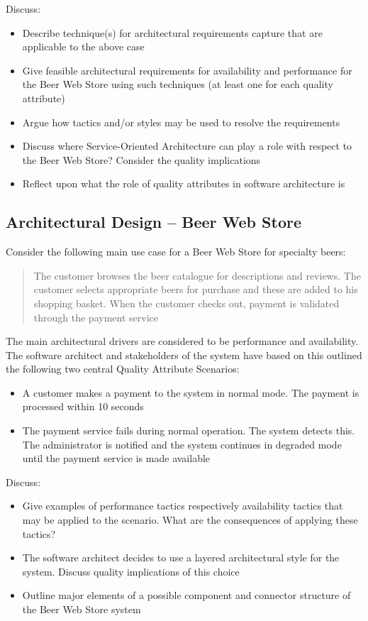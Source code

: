 Discuss:
\begin{itemize}
    \item Describe technique(s) for architectural requirements capture
    that are applicable to the above case
    \item Give feasible architectural requirements for availability
    and performance for the Beer Web Store using such techniques (at
    least one for each quality attribute)
    \item Argue how tactics and/or styles may be used to resolve the requirements
    \item Discuss where Service-Oriented Architecture can play a role
    with respect to the Beer Web Store? Consider the quality implications
    \item Reflect upon what the role of quality attributes in software
    architecture is
\end{itemize}

\newpage
\subsection{Architectural Design -- Beer Web Store}
Consider the following main use case for a Beer Web Store for specialty
beers:
\begin{quote}
  The customer browses the beer catalogue for descriptions and
  reviews. The customer selects appropriate beers for purchase and
  these are added to his shopping basket. When the customer checks
  out, payment is validated through the payment service
\end{quote}
The main architectural drivers are considered to be performance and
availability. The software architect and stakeholders of the system
have based on this outlined the following two central Quality
Attribute Scenarios:
\begin{itemize}
  \item A customer makes a payment to the system in normal mode. The
  payment is processed within 10 seconds
  \item The payment service fails during normal operation. The system
  detects this. The administrator is notified and the system continues
  in degraded mode until the payment service is made available
\end{itemize}

Discuss:
\begin{itemize}
\item Give examples of performance tactics respectively availability
tactics that may be applied to the scenario. What are the consequences
of applying these tactics?
\item The software architect decides to use a layered architectural
style for the system. Discuss quality implications of this choice
\item Outline major elements of a possible component and connector
structure of the Beer Web Store system
\end{itemize}


